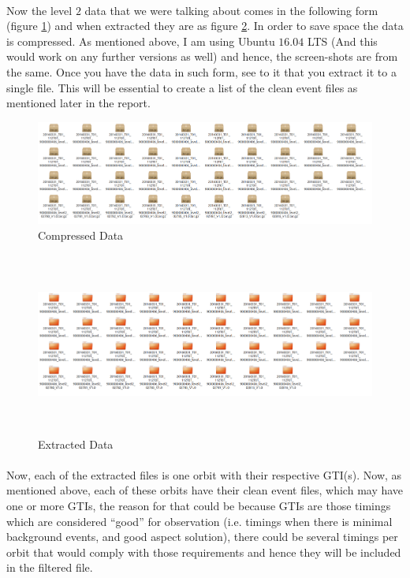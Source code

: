 \documentclass[a4paper,twoside]{report}
\numberwithin{equation}{section}
\begin{document}
\paragraph{}
Now the level $2$ data that we were talking about comes in the following form (figure \ref{Crab_Compressed}) and when extracted they are as figure \ref{Crab_Extracted}. In order to save space the data is compressed. As mentioned above, I am using Ubuntu $16.04$ LTS (And this would work on any further versions as well) and hence, the screen-shots are from the same. Once you have the data in such form, see to it that you extract it to a single file. This will be essential to create a list of the clean event files as mentioned later in the report. 
\begin{figure}[h]
\includegraphics[width=1.0\linewidth]{Crab_Level2_Compressed.jpg} 
\caption{Compressed Data}
\label{Crab_Compressed}
\end{figure}
\begin{figure}[h]
\includegraphics[width=1.0\linewidth, height=6cm]{Crab_Level2_Extracted.jpg}
\caption{Extracted Data}
\label{Crab_Extracted}
\end{figure}
\paragraph{}
Now, each of the extracted files is one orbit with their respective GTI(s). Now, as mentioned above, each of these orbits have their clean event files, which may have one or more GTIs, the reason for that could be because GTIs are those timings which are considered “good” for observation (i.e. timings when there is minimal background events, and good aspect solution), there could be several timings per orbit that would comply with those requirements and hence they will be included in the filtered file.  
\end{document}
